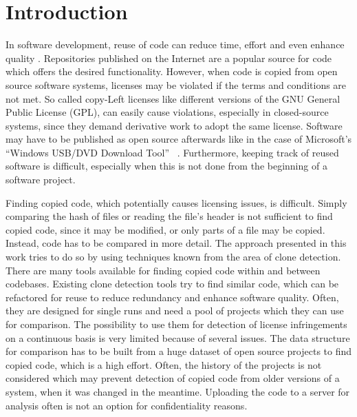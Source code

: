 
\chapter{Introduction}\label{chapter:introduction}
In software development, reuse of code can reduce time, effort and even enhance quality \cite{krueger1992software}.
Repositories published on the Internet are a popular source for code which offers the desired functionality.
However, when code is copied from open source software systems, licenses may be violated if the terms and conditions are not met.
So called copy-Left licenses like different versions of the GNU General Public License (GPL), can easily cause violations, especially in closed-source systems, since they demand derivative work to adopt the same license.
Software may have to be published as open source afterwards like in the case of Microsoft's ``Windows USB/DVD Download Tool'' \ \cite{microsoft2009download}.
Furthermore, keeping track of reused software is difficult, especially when this is not done from the beginning of a software project.

Finding copied code, which potentially causes licensing issues, is difficult.
Simply comparing the hash of files or reading the file's header is not sufficient to find copied code, since it may be modified, or only parts of a file may be copied.
Instead, code has to be compared in more detail.
The approach presented in this work tries to do so by using techniques known from the area of clone detection.
There are many tools available for finding copied code within and between codebases.
Existing clone detection tools try to find similar code, which can be refactored for reuse to reduce redundancy and enhance software quality.
Often, they are designed for single runs and need a pool of projects which they can use for comparison.
The possibility to use them for detection of license infringements on a continuous basis is very limited because of several issues.
The data structure for comparison has to be built from a huge dataset of open source projects to find copied code, which is a high effort.
Often, the history of the projects is not considered which may prevent detection of copied code from older versions of a system, when it was changed in the meantime.
Uploading the code to a server for analysis often is not an option for confidentiality reasons.

